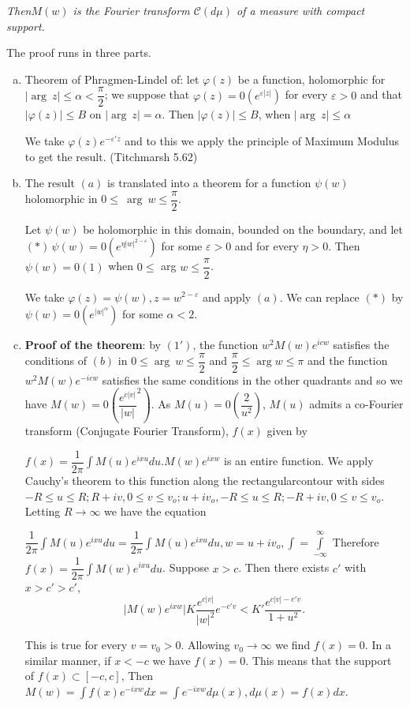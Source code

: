 \noindent
\textit{Then\pageoriginale $M(w)$ is the Fourier transform $\mathscr{C}(d \mu)$ of a
 measure with compact support.} 
 
 The proof runs in three parts.
 \begin{enumerate}[(a)]
\item Theorem of Phragmen-Lindel of: let $\varphi (z)$ be a function,
 holomorphic for $\Big|\arg ~ z\Big| \leq \alpha <
 \dfrac{\pi}{2}$; we suppose that $\varphi(z) = 0(e^{\varepsilon
 |z|})$ for every $\varepsilon >0$ and that $| \varphi (z) | \leq
 B$ on $|\arg ~ z| = \alpha$. Then $|\varphi (z) |\leq B$, when
 $|\arg ~ z| \leq \alpha$ 

 We take $\varphi (z) e^{- \varepsilon' z} $ and to this we apply the
 principle of Maximum Modulus to get the result. (Titchmarsh 5.62) 
\item The result $(a)$ is translated into a theorem for a function
 $\psi(w)$ holomorphic in $0 \leq ~ \arg ~ w \leq \dfrac{\pi}{2}$. 

 Let $\psi (w)$ be holomorphic in this domain, bounded on the
 boundary, and let $(*)\, \psi (w) = 0 (e^{\eta |w|^{2-\varepsilon}})$
 for some $\varepsilon > 0$ and for every $\eta > 0$. Then $\psi (w)
 = 0(1)$ when $0 \leq $ arg $w \leq \dfrac{\pi}{2}$. 

 We take $\varphi (z) = \psi (w), z = w^{2- \varepsilon}$ and
 apply $(a)$. We can replace $(*)$ by $\psi (w) = 0
 (e^{|w|^{\alpha}})$ for some $\alpha < 2$. 
\item \textbf{Proof of the theorem}: by $(1')$, the function $w^2 M(w)
 e^{icw}$ satisfies the conditions of $(b) $ in $0 \leq \arg ~ w \leq
 \dfrac{\pi}{2}$ and $\dfrac{\pi}{2} \leq \arg w \leq \pi$ and the
 function $w^2 M (w) e^{-icw}$ satisfies the same conditions in the
 other quadrants and so we have $M (w) =
 0(\dfrac{e^{c|v|}}{|w|}^2)$. As $M(u) = 0(\dfrac{2}{u^2})$, $M(u)$
 admits a co-Fourier transform (Conjugate Fourier Transform), $f(x)$
 given by 

 $f(x) = \dfrac{1}{2 \pi} \int M(u) e^{ixu} du. M(w)e^{ixw}$ is an
 entire function. We apply Cauchy's theorem to this function along the
 rectangular\pageoriginale contour with sides $-R \leq u \leq R; R + iv, 0 \leq v
 \leq v_o; u + iv_o, -R \leq u \leq R; -R + iv, 0 \leq v \leq
 v_o$. Letting $R \to \infty$ we have the equation 

 $\dfrac{1}{2 \pi} \int M(u) e^{ixu} du = \dfrac{1}{2 \pi} \int M(u)
 e^{ixu} du, w = u + iv_o, \int = \int\limits^{\infty}_{- \infty}$
 Therefore $f(x) = \dfrac{1}{2 \pi} \int M(w) e^{ixu} du$. Suppose $x
 > c$. Then there exists $c'$ with $x > c' > c'$, 
 $$
 \Big|M(w) e^{ixw}\Big| K \frac{e^{c|v|}}{|w|^2} e^{-c'v} < K'
 \dfrac{e^{c|v|- c'v}}{1+u^2}. 
 $$

 This is true for every $v = v_0 > 0$. Allowing $v_0 \to \infty$ we
 find $f(x)= 0$. In a similar manner, if $x< -c$ we have $f(x) =
 0$. This means that the support of $f(x) \subset [-c, c]$, Then
 $M(w) = \int f(x) e^{-ixw} dx = \int e^{-ixw} d \mu (x), d \mu (x) =
 f (x) dx$. 
 \end{enumerate} 
 
